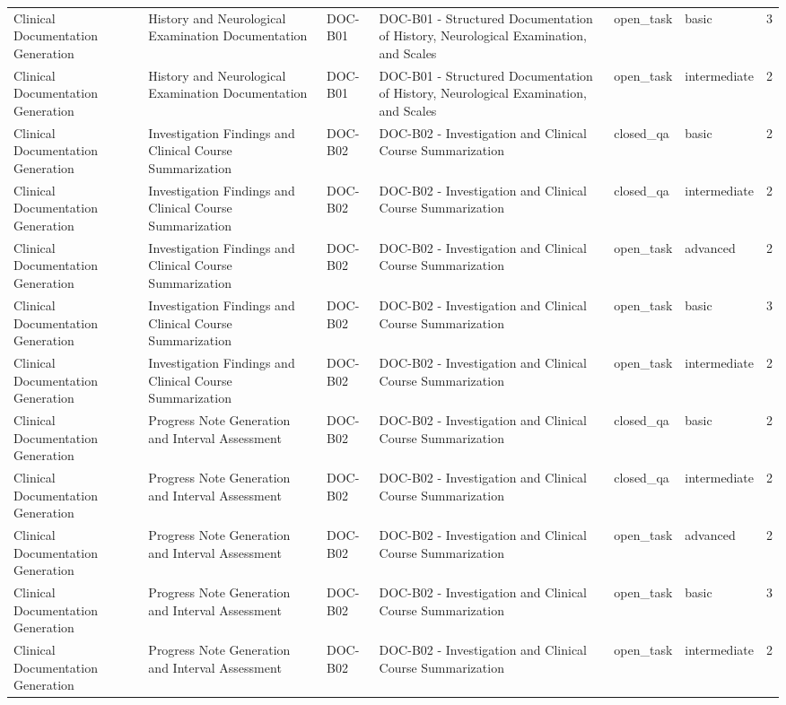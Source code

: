 \begin{tabular}{llllllr}
Clinical Documentation Generation & History and Neurological Examination Documentation & DOC-B01 & DOC-B01 - Structured Documentation of History, Neurological Examination, and Scales & open_task & basic & 3 \\
Clinical Documentation Generation & History and Neurological Examination Documentation & DOC-B01 & DOC-B01 - Structured Documentation of History, Neurological Examination, and Scales & open_task & intermediate & 2 \\
Clinical Documentation Generation & Investigation Findings and Clinical Course Summarization & DOC-B02 & DOC-B02 - Investigation and Clinical Course Summarization & closed_qa & basic & 2 \\
Clinical Documentation Generation & Investigation Findings and Clinical Course Summarization & DOC-B02 & DOC-B02 - Investigation and Clinical Course Summarization & closed_qa & intermediate & 2 \\
Clinical Documentation Generation & Investigation Findings and Clinical Course Summarization & DOC-B02 & DOC-B02 - Investigation and Clinical Course Summarization & open_task & advanced & 2 \\
Clinical Documentation Generation & Investigation Findings and Clinical Course Summarization & DOC-B02 & DOC-B02 - Investigation and Clinical Course Summarization & open_task & basic & 3 \\
Clinical Documentation Generation & Investigation Findings and Clinical Course Summarization & DOC-B02 & DOC-B02 - Investigation and Clinical Course Summarization & open_task & intermediate & 2 \\
Clinical Documentation Generation & Progress Note Generation and Interval Assessment & DOC-B02 & DOC-B02 - Investigation and Clinical Course Summarization & closed_qa & basic & 2 \\
Clinical Documentation Generation & Progress Note Generation and Interval Assessment & DOC-B02 & DOC-B02 - Investigation and Clinical Course Summarization & closed_qa & intermediate & 2 \\
Clinical Documentation Generation & Progress Note Generation and Interval Assessment & DOC-B02 & DOC-B02 - Investigation and Clinical Course Summarization & open_task & advanced & 2 \\
Clinical Documentation Generation & Progress Note Generation and Interval Assessment & DOC-B02 & DOC-B02 - Investigation and Clinical Course Summarization & open_task & basic & 3 \\
Clinical Documentation Generation & Progress Note Generation and Interval Assessment & DOC-B02 & DOC-B02 - Investigation and Clinical Course Summarization & open_task & intermediate & 2 \\

\end{tabular}
